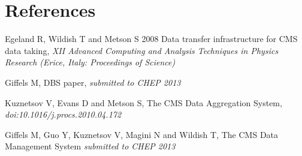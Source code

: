 \section*{References}

\begin{thebibliography}{1}
  Egeland R, Wildish T and Metson S 2008 Data transfer infrastructure for CMS data taking,  {\it XII Advanced Computing and Analysis Techniques in Physics Research (Erice, Italy: Proceedings of Science)}

Giffels M, DBS paper, {\it submitted to CHEP 2013}

Kuznetsov V, Evans D and Metson S, The CMS Data Aggregation System,
{\it doi:10.1016/j.procs.2010.04.172}

Giffels M, Guo Y, Kuznetsov V, Magini N and Wildish T, The CMS Data Management System {\it submitted to CHEP 2013}

\end{thebibliography}
